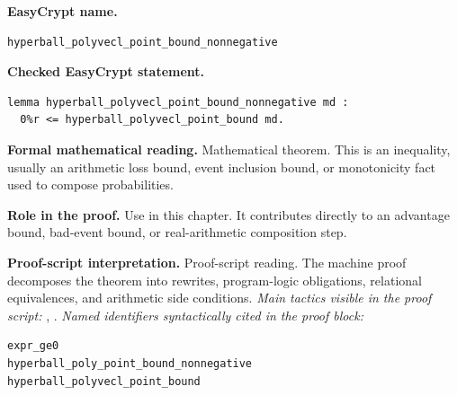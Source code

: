 \begin{formaltheorem}
\noindent\textbf{EasyCrypt name.}
\begin{lstlisting}[language=EasyCrypt,basicstyle=\ttfamily\scriptsize]
hyperball_polyvecl_point_bound_nonnegative
\end{lstlisting}
\noindent\textbf{Checked EasyCrypt statement.}
\begin{lstlisting}[language=EasyCrypt,basicstyle=\ttfamily\scriptsize]
lemma hyperball_polyvecl_point_bound_nonnegative md :
  0%r <= hyperball_polyvecl_point_bound md.
\end{lstlisting}
\noindent\textbf{Formal mathematical reading.}
Mathematical theorem. This is an inequality, usually an arithmetic loss bound, event inclusion bound, or monotonicity fact used to compose probabilities.

\noindent\textbf{Role in the proof.}
Use in this chapter. It contributes directly to an advantage bound, bad-event bound, or real-arithmetic composition step.

\noindent\textbf{Proof-script interpretation.}
Proof-script reading. The machine proof decomposes the theorem into rewrites, program-logic obligations, relational equivalences, and arithmetic side conditions.
\emph{Main tactics visible in the proof script:} , .
\emph{Named identifiers syntactically cited in the proof block:}
\begin{lstlisting}[language=EasyCrypt,basicstyle=\ttfamily\scriptsize]
expr_ge0
hyperball_poly_point_bound_nonnegative
hyperball_polyvecl_point_bound
\end{lstlisting}

\end{formaltheorem}

